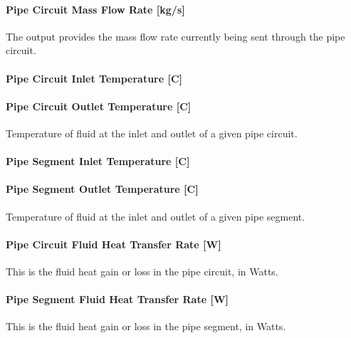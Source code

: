 \paragraph{Pipe Circuit Mass Flow Rate {[}kg/s{]}}\label{pipe-circuit-mass-flow-rate-kgs}

The output provides the mass flow rate currently being sent through the pipe circuit.

\paragraph{Pipe Circuit Inlet Temperature {[}C{]}}\label{pipe-circuit-inlet-temperature-c}

\paragraph{Pipe Circuit Outlet Temperature {[}C{]}}\label{pipe-circuit-outlet-temperature-c}

Temperature of fluid at the inlet and outlet of a given pipe circuit.

\paragraph{Pipe Segment Inlet Temperature {[}C{]}}\label{pipe-segment-inlet-temperature-c}

\paragraph{Pipe Segment Outlet Temperature {[}C{]}}\label{pipe-segment-outlet-temperature-c}

Temperature of fluid at the inlet and outlet of a given pipe segment.

\paragraph{Pipe Circuit Fluid Heat Transfer Rate {[}W{]}}\label{pipe-circuit-fluid-heat-transfer-rate-w}

This is the fluid heat gain or loss in the pipe circuit, in Watts.

\paragraph{Pipe Segment Fluid Heat Transfer Rate {[}W{]}}\label{pipe-segment-fluid-heat-transfer-rate-w}

This is the fluid heat gain or loss in the pipe segment, in Watts.

